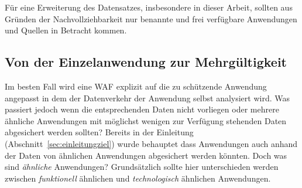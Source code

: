 Für eine Erweiterung des Datensatzes, insbesondere in dieser Arbeit, sollten aus Gründen der Nachvollziehbarkeit nur benannte und frei verfügbare Anwendungen und Quellen in Betracht kommen. 




\subsection{Von der Einzelanwendung zur Mehrgültigkeit}
Im besten Fall wird eine WAF explizit auf die zu schützende Anwendung angepasst in dem der Datenverkehr der Anwendung selbst analysiert wird. Was passiert jedoch wenn die entsprechenden Daten nicht vorliegen oder mehrere ähnliche Anwendungen mit möglichst wenigen zur Verfügung stehenden Daten abgesichert werden sollten? Bereits in der Einleitung (Abschnitt~\ref{sec:einleitungziel}) wurde behauptet dass Anwendungen auch anhand der Daten von ähnlichen Anwendungen abgesichert werden könnten. Doch was sind \glqq\emph{ähnliche}\grqq{} Anwendungen? Grundsätzlich sollte hier unterschieden werden zwischen \emph{funktionell} ähnlichen und \emph{technologisch} ähnlichen Anwendungen.\\

